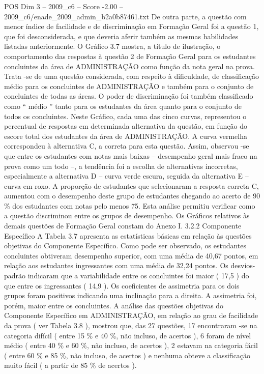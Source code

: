 \begin{textsample}{POS Dim 3 – 2009\_c6 – Score -2.00 – 2009\_c6/enade\_2009\_admin\_b2a0b87461.txt}
De outra parte, a questão com menor índice de facilidade e de discriminação em Formação Geral foi a questão 1, que foi desconsiderada, e que deveria aferir também as mesmas habilidades listadas anteriormente.
O Gráfico 3.7 mostra, a título de ilustração, o comportamento das respostas à questão 2 de Formação Geral para os estudantes concluintes da área de ADMINISTRAÇÃO como função da nota geral na prova.
Trata -se de uma questão considerada, com respeito à dificuldade, de classificação médio para os concluintes de ADMINISTRAÇÃO e também para o conjunto de concluintes de todas as áreas.
O poder de discriminação foi também classificado como “ médio ” tanto para os estudantes da área quanto para o conjunto de todos os concluintes.
Neste Gráfico, cada uma das cinco curvas, representou o percentual de respostas em determinada alternativa da questão, em função do escore total dos estudantes da área de ADMINISTRAÇÃO.
A curva vermelha correspondeu à alternativa C, a correta para esta questão.
Assim, observou -se que entre os estudantes com notas mais baixas – desempenho geral mais fraco na prova como um todo –, a tendência foi a escolha de alternativas incorretas, especialmente a alternativa D – curva verde escura, seguida da alternativa E – curva em roxo.
A proporção de estudantes que selecionaram a resposta correta C, aumentou com o desempenho deste grupo de estudantes chegando ao acerto de 90 \% dos estudantes com notas pelo menos 75.
Esta análise permitiu verificar como a questão discriminou entre os grupos de desempenho.
Os Gráficos relativos às demais questões de Formação Geral constam do Anexo I. 3.2.2 Componente Específico A Tabela 3.7 apresenta as estatísticas básicas em relação às questões objetivas do Componente Específico.
Como pode ser observado, os estudantes concluintes obtiveram desempenho superior, com uma média de 40,67 pontos, em relação aos estudantes ingressantes com uma média de 32,24 pontos.
Os desvios-padrão indicaram que a variabilidade entre os concluintes foi maior ( 17,5 ) do que entre os ingressantes ( 14,9 ).
Os coeficientes de assimetria para os dois grupos foram positivos indicando uma inclinação para a direita.
A assimetria foi, porém, maior entre os concluintes.
A análise das questões objetivas do Componente Específico em ADMINISTRAÇÃO, em relação ao grau de facilidade da prova ( ver Tabela 3.8 ), mostrou que, das 27 questões, 17 encontraram -se na categoria difícil ( entre 15 \% e 40 \%, não incluso, de acertos ), 6 foram de nível médio ( entre 40 \% e 60 \%, não incluso, de acertos ), 2 estavam na categoria fácil ( entre 60 \% e 85 \%, não incluso, de acertos ) e nenhuma obteve a classificação muito fácil ( a partir de 85 \% de acertos ).

\end{textsample}

